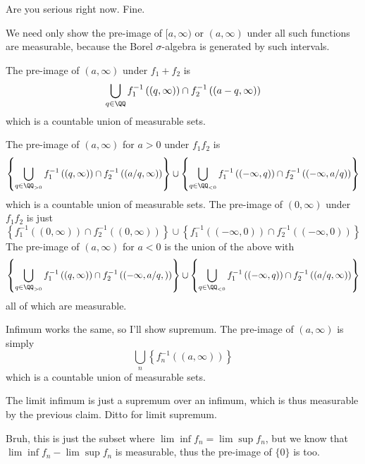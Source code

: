 \documentclass[11pt, headheight=30pt]{scrartcl}
\begin{document}
Are you serious right now. Fine.

We need only show the pre-image of $[a,\infty)$ or $(a,\infty)$ under all such functions
are measurable, because the Borel $\sigma$-algebra
is generated by such intervals.

\begin{psec*}
    [Addition]
    The pre-image of $(a,\infty)$ under $f_1 + f_2$ is
    \[
        \bigcup_{q\in \QQ} f_1^{-1}\left((q,\infty)\right) \cap f_2^{-1}\left((a-q,\infty)\right)
    \]
    which is a countable union of measurable sets.
\end{psec*}


\begin{psec*}
    [Multiplication]
    The pre-image of $(a,\infty)$ for $a > 0$ under $f_1f_2$
    is
    \[
        \left\{\bigcup_{q\in \QQ_{> 0}} f_1^{-1}\left((q,\infty)\right) \cap f_2^{-1}\left((a/q,\infty)\right)\right\}
        \cup \left\{\bigcup_{q\in \QQ_{< 0}} f_1^{-1}\left((-\infty, q)\right) \cap f_2^{-1}\left((-\infty, a/q)\right)\right\}
    \]
    which is a countable union of measurable sets. The pre-image
    of $(0,\infty)$ under $f_1f_2$ is just
    \[
        \left\{f_1^{-1}\left((0,\infty)\right)\cap f_2^{-1}\left((0,\infty)\right)\right\}
        \cup \left\{f_1^{-1}\left((-\infty, 0)\right)\cap f_2^{-1}\left((-\infty, 0)\right)\right\}
    \]
    The pre-image of $(a, \infty)$ for $a < 0$ is the union of the above with
    \[
        \left\{\bigcup_{q\in \QQ_{> 0}} f_1^{-1}\left((q,\infty)\right) \cap f_2^{-1}\left((-\infty, a/q,)\right)\right\}
        \cup \left\{\bigcup_{q\in \QQ_{< 0}} f_1^{-1}\left((-\infty, q)\right) \cap f_2^{-1}\left((a/q, \infty)\right)\right\}
    \]
    all of which are measurable.
\end{psec*}
\begin{psec*}
    Infimum works the same, so I'll show supremum. The pre-image of $(a,\infty)$
    is simply
    \[
        \bigcup_n \left\{f_n^{-1}\left((a,\infty)\right)\right\}    
    \]
    which is a countable union of measurable sets.

    The limit infimum is just a supremum over an infimum, which
    is thus measurable by the previous claim. Ditto for limit supremum.
\end{psec*}

\begin{psec*}
    Bruh, this is just the subset where $\lim\inf f_n = \lim\sup f_n$,
    but we know that $\lim\inf f_n - \lim\sup f_n$ is measurable,
    thus the pre-image of $\{0\}$ is too.
\end{psec*}
\end{document}
